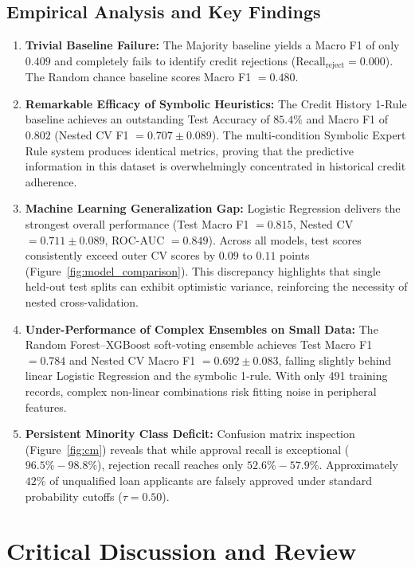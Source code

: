 \documentclass{COMPXXXX}
\begin{document}
\subsection{Empirical Analysis and Key Findings}
\begin{enumerate}
    \item \textbf{Trivial Baseline Failure:} The Majority baseline yields a Macro F1 of only $0.409$ and completely fails to identify credit rejections ($\text{Recall}_{\text{reject}} = 0.000$). The Random chance baseline scores Macro F1 $= 0.480$.
    \item \textbf{Remarkable Efficacy of Symbolic Heuristics:} The Credit History 1-Rule baseline achieves an outstanding Test Accuracy of $85.4\%$ and Macro F1 of $0.802$ (Nested CV F1 $= 0.707 \pm 0.089$). The multi-condition Symbolic Expert Rule system produces identical metrics, proving that the predictive information in this dataset is overwhelmingly concentrated in historical credit adherence.
    \item \textbf{Machine Learning Generalization Gap:} Logistic Regression delivers the strongest overall performance (Test Macro F1 $= 0.815$, Nested CV $= 0.711 \pm 0.089$, ROC-AUC $= 0.849$). Across all models, test scores consistently exceed outer CV scores by $0.09$ to $0.11$ points (Figure~\ref{fig:model_comparison}). This discrepancy highlights that single held-out test splits can exhibit optimistic variance, reinforcing the necessity of nested cross-validation.
    \item \textbf{Under-Performance of Complex Ensembles on Small Data:} The Random Forest--XGBoost soft-voting ensemble achieves Test Macro F1 $= 0.784$ and Nested CV Macro F1 $= 0.692 \pm 0.083$, falling slightly behind linear Logistic Regression and the symbolic 1-rule. With only 491 training records, complex non-linear combinations risk fitting noise in peripheral features.
    \item \textbf{Persistent Minority Class Deficit:} Confusion matrix inspection (Figure~\ref{fig:cm}) reveals that while approval recall is exceptional ($96.5\% - 98.8\%$), rejection recall reaches only $52.6\% - 57.9\%$. Approximately $42\%$ of unqualified loan applicants are falsely approved under standard probability cutoffs ($\tau=0.50$).
\end{enumerate}

\section{Critical Discussion and Review}
\label{sec:discussion}
\end{document}
